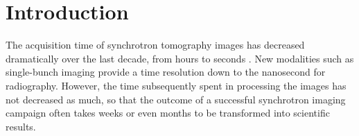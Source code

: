 \documentclass[twocolumn]{bmcart}%
\begin{document}
\begin{frontmatter}
\begin{abstractbox}

\begin{keyword}
\end{keyword}


\end{abstractbox}
%

\end{frontmatter}



\section*{Introduction}

The acquisition time of synchrotron tomography images has decreased
dramatically over the last decade, from hours to
seconds \citep{Maire2014}. New modalities such as single-bunch
imaging \citep{Rack2014} provide a time resolution down to the nanosecond
for radiography. However, the time subsequently spent in processing the
images has not decreased as much, so that the outcome of a successful
synchrotron imaging campaign often takes weeks or even months to be
transformed into scientific results. 
\end{document}
